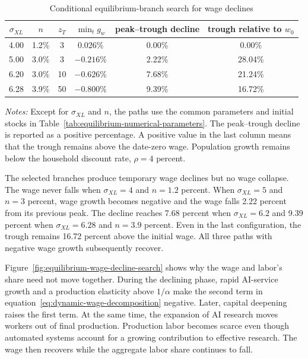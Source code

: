 \begin{table}[htbp]
    \centering
    \caption{Conditional equilibrium-branch search for wage declines}
    \label{tab:wage-decline-equilibrium-search}
    \begin{tabular}{cccccc}
        \toprule
        $\sigma_{XL}$ & $n$ & $z_T$ & $\min_t g_w$
        & peak--trough decline & trough relative to $w_0$ \\
        \midrule
        4.00 & 1.2\% & 3  &  0.026\% & 0.00\% & 0.00\% \\
        5.00 & 3.0\% & 3  & $-0.216\%$ & 2.22\% & 28.04\% \\
        6.20 & 3.0\% & 10 & $-0.626\%$ & 7.68\% & 21.24\% \\
        6.28 & 3.9\% & 50 & $-0.800\%$ & 9.39\% & 16.72\% \\
        \bottomrule
    \end{tabular}
    \begin{minipage}{0.96\textwidth}
    \footnotesize\emph{Notes:} Except for $\sigma_{XL}$ and $n$, the paths use the
    common parameters and initial stocks in
    Table~\ref{tab:equilibrium-numerical-parameters}. The peak--trough decline is
    reported as a positive percentage. A positive value in the last column means
    that the trough remains above the date-zero wage. Population growth remains
    below the household discount rate, $\rho=4$ percent.
    \end{minipage}
\end{table}

The selected branches produce temporary wage declines but no wage collapse. The wage never falls
when $\sigma_{XL}=4$ and $n=1.2$ percent. When $\sigma_{XL}=5$ and $n=3$ percent,
wage growth becomes negative and the wage falls 2.22 percent from its previous peak.
The decline reaches 7.68 percent when $\sigma_{XL}=6.2$ and 9.39 percent when
$\sigma_{XL}=6.28$ and $n=3.9$ percent. Even in the last configuration, the trough
remains 16.72 percent above the initial wage. All three paths with negative wage
growth subsequently recover.

Figure~\ref{fig:equilibrium-wage-decline-search} shows why the wage and labor's
share need not move together. During the declining phase, rapid AI-service growth
and a production elasticity above $1/\alpha$ make the second term in
equation~\eqref{eq:dynamic-wage-decomposition} negative. Later, capital deepening
raises the first term. At the same time, the expansion of AI research moves workers
out of final production. Production labor becomes scarce even though automated
systems account for a growing contribution to effective research. The wage then
recovers while the aggregate labor share continues to fall.

